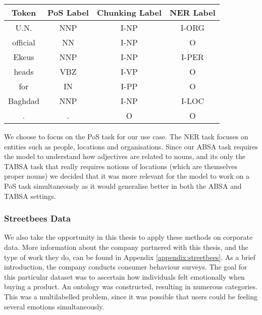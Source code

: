 \begin{center}
	\begin{tabular}{||c | c | c | c||} 
		\hline
		Token & PoS Label\footnotemark & Chunking Label & NER Label  \\ [0.5ex] 
		\hline\hline
		U.N. & NNP & I-NP & I-ORG\\
		official & NN & I-NP & O\\
		Ekeus & NNP & I-NP & I-PER\\
		heads & VBZ & I-VP & O\\
		for & IN & I-PP & O\\
		Baghdad & NNP & I-NP & I-LOC\\
		. & . & O & O\\
		\hline
	\end{tabular}
	\label{table:methodology:nerexample}
\end{center}

We choose to focus on the PoS task for our use case. The NER task focuses on entities such as people, locations and organisations. Since our ABSA task requires the model to understand how adjectives are related to nouns, and its only the TABSA task that really requires notions of locations (which are themselves proper nouns) we decided that it was more relevant for the model to work on a PoS task simultaneously as it would generalise better in both the ABSA and TABSA settings.


\subsubsection{Streetbees Data} \label{section:data:streetbees}
We also take the opportunity in this thesis to apply these methods on corporate data. More information about the company partnered with this thesis, and the type of work they do, can be found in Appendix \ref{appendix:streetbees}. As a brief introduction, the company conducts consumer behaviour surveys. The goal for this particular dataset was to ascertain how individuals felt emotionally when buying a product. An ontology was constructed, resulting in numerous categories. This was a multilabelled problem, since it was possible that users could be feeling several emotions simultaneously.


